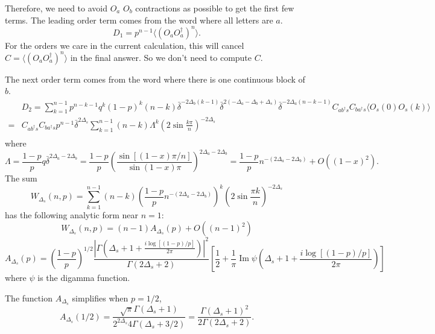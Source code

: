 \documentclass{article}
\theoremstyle{plain}
\theoremstyle{definition}
\theoremstyle{plain}
\def\la{\langle}
\def\ra{\rangle}
\begin{document}
Therefore, we need to avoid $O_a$ $O_b$ contractions as possible to get the first few terms. The leading order term comes from the word where all letters are $a$.
\begin{equation}
    D_1= p^{n-1} \la (O_a O_a^\dagger)^n \ra.
\end{equation}
For the orders we care in the current calculation, this will cancel $C=\la (O_a O_a^\dagger)^n \ra$ in the final answer. So we don't need to compute $C$.

The next order term comes from the word where there is one continuous block of $b$. 
\begin{equation}
\begin{aligned}
    &D_2=\sum_{k=1}^{n-1} p^{n-k-1}q^{k}(1-p)^k (n-k) \bar \delta^{-2\Delta_b(k-1)} \bar\delta^{2(-\Delta_a-\Delta_b+\Delta_s)} \bar\delta^{-2\Delta_a(n-k-1)}C_{ab^\dagger s} C_{ba^\dagger s} \la O_s(0)O_s(k) \ra    \\
    =& C_{ab^\dagger s} C_{ba^\dagger s} p^{n-1} \bar \delta^{2\Delta_s}\sum_{k=1}^{n-1} (n-k) \Lambda^k  (2\sin \frac{k\pi}{n})^{-2\Delta_s}\\
\end{aligned}
\end{equation}
where 
\begin{equation}
    \Lambda=\frac{1-p}{p}q\bar \delta^{2\Delta_a-2\Delta_b} =\frac{1-p}{p} \left(\frac{\sin[(1-x)\pi/n]}{\sin(1-x)\pi} \right)^{2\Delta_a-2\Delta_b} = \frac{1-p}{p}n^{-(2\Delta_a-2\Delta_b)} + O((1-x)^2).
\end{equation}
The sum
\begin{equation}
   W_{\Delta_s}(n,p)= \sum_{k=1}^{n-1} (n-k)\left(\frac{1-p}{p}n^{-(2\Delta_a-2\Delta_b)}\right)^k (2\sin \frac{\pi k}{n})^{-2\Delta_s}
\end{equation}
has the following analytic form near $n=1$:
\begin{equation}
    W_{\Delta_s} (n,p)=(n-1) A_{\Delta_s}(p) + O((n-1)^2)
\end{equation}
   \begin{equation}
    A_{\Delta_s} (p) =\left(\frac{1-p}{p}\right)^{1 / 2} \frac{\left|\Gamma\left(\Delta_s+1+\frac{i \log [(1-p)/p]}{2 \pi}\right)\right|^2}{\Gamma(2 \Delta_s+2)}\left[\frac{1}{2}+\frac{1}{\pi} \operatorname{Im} \psi\left(\Delta_s+1+\frac{i \log [(1-p)/p]}{2 \pi}\right)\right]
\end{equation}
where $\psi$ is the digamma function.

The function $A_{\Delta_s}$ simplifies when $p=1/2$,
\begin{equation}
    A_{\Delta_s}(1/2)= \frac{\sqrt{\pi}\Gamma(\Delta_s+1)}{2^{2\Delta_s}4\Gamma(\Delta_s+3/2)}=\frac{\Gamma(\Delta_s+1)^2}{2\Gamma(2\Delta_s+2)}.
\end{equation}
\end{document}
